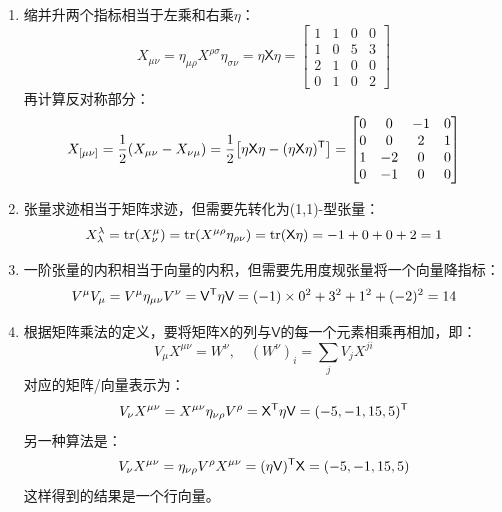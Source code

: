 \documentclass[a4paper]{article}
\newcommand{\trans}{\text{\textsf{T}}}
\begin{document}
\begin{enumerate}
\begin{enumerate}
        \item[(d)]
        缩并升两个指标相当于左乘和右乘$\mathsf{\eta}$：
        \[
            X_{\mu\nu} = \eta_{\mu\rho} X^{\rho\sigma} \eta_{\sigma\nu} = \mathsf{\eta X \eta} =
        \begin{bmatrix}
            1 & 1 & 0 & 0 \\
            1 & 0 & 5 & 3 \\
            2 & 1 & 0 & 0 \\
            0 & 1 & 0 & 2
        \end{bmatrix}
        \]
        再计算反对称部分：
        \[
            X_{[\mu\nu]} = \frac{1}{2}(X_{\mu\nu} - X_{\nu\mu}) = \frac{1}{2} \qty[\mathsf{\eta X \eta} - (\mathsf{\eta X \eta})^\trans] =
        \begin{bmatrix}
            0 & 0 & -1 & 0 \\
            0 & 0 & 2 & 1 \\
            1 & -2 & 0 & 0 \\
            0 & -1 & 0 & 0
        \end{bmatrix}
        \]

        \item[(e)]
        张量求迹相当于矩阵求迹，但需要先转化为(1,1)-型张量：
        \[
            X^\lambda_\lambda = \tr(X^\mu_\nu) = \tr(X^{\mu\rho} \eta_{\rho\nu}) = \tr(\mathsf{X \eta}) = -1 + 0 + 0 + 2 = 1
        \]

        \item[(f)]
        一阶张量的内积相当于向量的内积，但需要先用度规张量将一个向量降指标：
        \[
            V^\mu V_\mu = V^\mu \eta_{\mu\nu} V^\nu = \mathsf{V^\trans \eta V} = (-1) \times 0^2 + 3^2 + 1^2 + (-2)^2 = 14
        \]

        \item[(g)]
        根据矩阵乘法的定义，要将矩阵$\mathsf{X}$的列与$\mathsf{V}$的每一个元素相乘再相加，即：
        \[
            V_\mu X^{\mu\nu} = W^\nu,\quad (W^\nu)_i = \sum_j V_j X^{ji}
        \]
        对应的矩阵/向量表示为：
        \[
            V_\nu X^{\mu\nu} = X^{\mu\nu} \eta_{\nu\rho} V^\rho = \mathsf{X^\trans \eta V} = (-5, -1, 15, 5)^\trans
        \]
        另一种算法是：
        \[
            V_\nu X^{\mu\nu} = \eta_{\nu\rho} V^\rho X^{\mu\nu} = \mathsf{(\eta V)^\trans X} = (-5, -1, 15, 5)
        \]
        这样得到的结果是一个行向量。
    \end{enumerate}


\end{enumerate}
\end{document}
